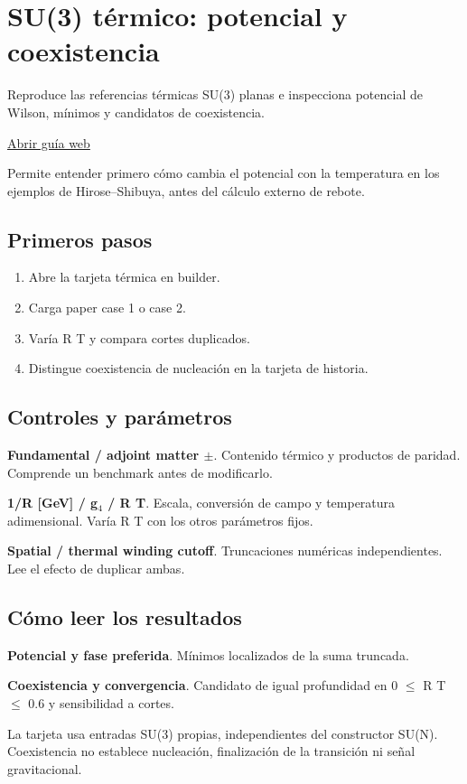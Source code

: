 \documentclass[11pt,a4paper]{article}
\begin{document}
\section{SU(3) térmico: potencial y coexistencia}
Reproduce las referencias térmicas SU(3) planas e inspecciona potencial de Wilson, mínimos y candidatos de coexistencia.

\href{https://karlesmarin.github.io/ghu-explorer/guide/es/thermal/index.html}{Abrir guía web}

Permite entender primero cómo cambia el potencial con la temperatura en los ejemplos de Hirose--Shibuya, antes del cálculo externo de rebote.
\subsection*{Primeros pasos}
\begin{enumerate}
\item Abre la tarjeta térmica en builder.
\item Carga paper case 1 o case 2.
\item Varía R T y compara cortes duplicados.
\item Distingue coexistencia de nucleación en la tarjeta de historia.
\end{enumerate}
\subsection*{Controles y parámetros}
\textbf{Fundamental / adjoint matter \ensuremath{\pm}}. Contenido térmico y productos de paridad. Comprende un benchmark antes de modificarlo.

\textbf{1/R [GeV] / g\ensuremath{{}_{4}} / R T}. Escala, conversión de campo y temperatura adimensional. Varía R T con los otros parámetros fijos.

\textbf{Spatial / thermal winding cutoff}. Truncaciones numéricas independientes. Lee el efecto de duplicar ambas.

\subsection*{Cómo leer los resultados}
\textbf{Potencial y fase preferida}. Mínimos localizados de la suma truncada.

\textbf{Coexistencia y convergencia}. Candidato de igual profundidad en 0 \ensuremath{\leq} R T \ensuremath{\leq} 0.6 y sensibilidad a cortes.

La tarjeta usa entradas SU(3) propias, independientes del constructor SU(N). Coexistencia no establece nucleación, finalización de la transición ni señal gravitacional.
\end{document}
